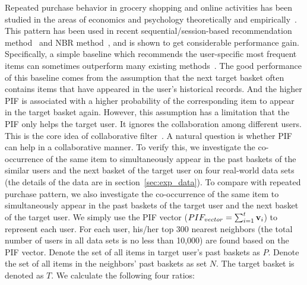 \documentclass[sigconf]{acmart}
\begin{document}
Repeated purchase behavior
in grocery shopping and online activities has been studied in the areas of economics and psychology theoretically and empirically~\cite{anderson2014dynamics}\cite{benson2016modeling}\cite{dawes2015has}\cite{jacoby1973brand}.  This pattern has been used in recent sequential/session-based recommendation method~\cite{ren2019repeatnet}\cite{wang2019modeling} and NBR method~\cite{hu2019sets2sets}\cite{wan2018representing}, and is shown to get  considerable performance gain.  Specifically, a simple baseline which recommends the  user-specific most  frequent items can sometimes outperform many existing  methods~\cite{hu2019sets2sets}.  The good performance of this baseline comes from the assumption that the next  target basket often  contains items that have appeared in the user's historical records. And the  higher PIF is associated with a higher probability of the corresponding item  to  appear in the target basket again.  However, this assumption has a limitation that the PIF only helps the target  user. It ignores the collaboration among different users. This is  the core idea of  collaborative filter~\cite{konstan1997grouplens}. A natural question is whether PIF can help in  a collaborative manner. To  verify this, we investigate the co-occurrence of the same item to simultaneously appear in the past baskets of the similar users and  the next basket of the  target user on four  real-world data sets (the details of the data are in  section~\ref{sec:exp_data}).  To compare with repeated purchase pattern,  we also investigate the  co-occurrence of the same item to simultaneously  appear in the past baskets of the target user and the  next basket of the target user. We simply use the PIF vector ($\small PIF_{vector} = \sum_{i=1}^t\mathbf{v}_i$) to represent each user. For each user, his/her top 300 nearest neighbors (the total number of users in all data sets is no less than 10,000) are found based on the PIF vector. Denote the set of all items in target user's past baskets as $P$. Denote the set of all items in the neighbors' past baskets as set $N$. The target basket is denoted as $T$.  We calculate the  following four ratios: 
\end{document}
